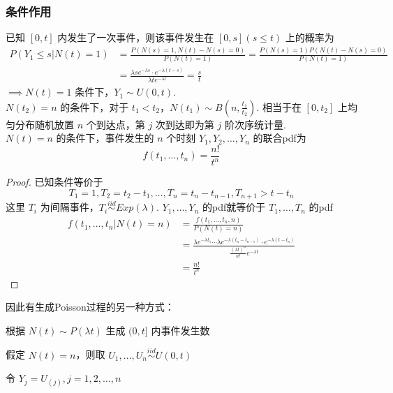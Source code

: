 \documentclass[./main.tex]{subfiles}
\begin{document}
\subsubsection{条件作用}
已知 $[0,t]$ 内发生了一次事件，则该事件发生在 $[0,s](s\le t)$ 上的概率为
\begin{align*}
    P(Y_1\le s|N(t)=1) & =\frac{P(N(s)=1,N(t)-N(s)=0)}{P(N(t)=1)}=\frac{P(N(s)=1)P(N(t)-N(s)=0)}{P(N(t)=1)} \\&=\frac{\lambda se^{-\lambda s}\cdot e^{-\lambda(t-s)}}{\lambda te^{-\lambda t}}=\frac{s}{t}
\end{align*}
$\implies N(t)=1$ 条件下，$Y_1\sim U(0,t)$. \\
$N(t_2)=n$ 的条件下，对于 $t_1<t_2$，$N(t_1)\sim B(n,\frac{t_1}{t_2})$. 相当于在 $[0,t_2]$ 上均匀分布随机放置 $n$ 个到达点，第 $j$ 次到达即为第 $j$ 阶{\kaishu 次序统计量}. \\
$N(t)=n$ 的条件下，事件发生的 $n$ 个时刻 $Y_1,Y_2,\dots,Y_n$ 的联合pdf为
\begin{equation}
    f(t_1,\dots,t_n)=\frac{n!}{t^n}
\end{equation}
\begin{proof}
    已知条件等价于 $$T_1=1,T_2=t_2-t_1,\dots,T_n=t_n-t_{n-1},T_{n+1}>t-t_n$$这里 $T_i$ 为间隔事件，$T_i\mathop\sim\limits^{iid} Exp(\lambda)$. $Y_1,\dots,Y_n$ 的pdf就等价于 $T_1,\dots,T_n$ 的pdf
    \begin{align*}
        f(t_1,\dots,t_n|N(t)=n) & =\frac{f(t_1,\dots,t_n,n)}{P(N(t)=n)}                                                                                                       \\
                                & =\frac{\lambda e^{-\lambda t_1}\cdots \lambda e^{-\lambda(t_n-t_{n-1})}\cdot e^{-\lambda(t-t_n)}}{\frac{(\lambda t)^{n}}{n!}e^{-\lambda t}} \\
                                & =\frac{n!}{t^n}
    \end{align*}
\end{proof}
\noindent 因此有生成Poisson过程的另一种方式：
\begin{enumerate*}
    \item 根据 $N(t)\sim P(\lambda t)$ 生成 $(0,t]$ 内事件发生数
    \item 假定 $N(t)=n$，则取 $U_1,\dots,U_n\mathop{\sim}\limits^{iid}U(0,t)$
    \item 令 $Y_j=U_{(j)},j=1,2,\dots,n$
\end{enumerate*}
\end{document}
